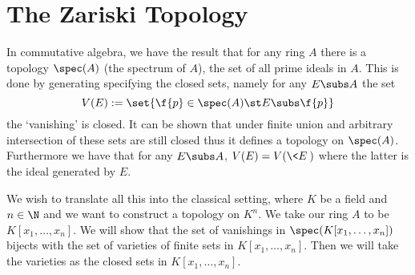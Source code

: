 \section{The Zariski Topology}
\begin{dfn}
    In commutative algebra, 
    we have the result that for any ring $A$ there is a topology $\spec(A)$
    (the spectrum of $A$),
    the set of all prime ideals in $A$.
    This is done by generating specifying the closed sets, 
    namely for any $E \subs A$ the set 
    \[V(E) := \set{\f{p} \in \spec(A) \st E \subs \f{p}}\]
    the `vanishing' is closed.
    It can be shown that under finite union and arbitrary intersection of these
    sets are still closed thus it defines a topology on $\spec(A)$.
    Furthermore we have that for any $E \subs A$, 
    $V(E) = V(\<E\>)$ where the latter is the ideal generated by $E$.
\end{dfn}
We wish to translate all this into the classical setting, 
where $K$ be a field and $n \in \N$ 
and we want to construct a topology on $K^n$.
We take our ring $A$ to be $K[x_1,\dots,x_n]$.
We will show that the set of vanishings in $\spec(K[x_1,\dots,x_n])$
bijects with
the set of varieties of finite sets in $K[x_1, \dots, x_n]$.
Then we will take the varieties as the closed sets in $K[x_1,\dots,x_n]$.

